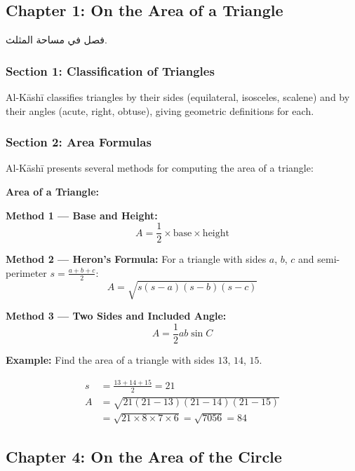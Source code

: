 \documentclass[11pt,a4paper]{article}
\newenvironment{arabicbox}{%
  \begin{framed}
  \begin{minipage}{\dimexpr\linewidth-2\fboxsep-2\fboxrule\relax}
  \setlength{\parindent}{0pt}
  \linespread{1.3}\selectfont
}{%
  \end{minipage}
  \end{framed}
}
\newenvironment{mathalgo}{%
  \par\vspace{0.3cm}
  \begin{framed}
  \setlength{\parindent}{0pt}
}{%
  \end{framed}
  \par\vspace{0.3cm}
}
\begin{document}
\subsection{Chapter 1: On the Area of a Triangle}

\begin{arabicbox}
\begin{Arabic}
فصل في مساحة المثلث.
\end{Arabic}
\end{arabicbox}

\vspace{0.3cm}

\subsubsection{Section 1: Classification of Triangles}

Al-K\=ash\=i classifies triangles by their sides (equilateral, isosceles,
scalene) and by their angles (acute, right, obtuse), giving geometric
definitions for each.

\subsubsection{Section 2: Area Formulas}

Al-K\=ash\=i presents several methods for computing the area of a triangle:

\begin{mathalgo}
\textbf{Area of a Triangle:}

\textbf{Method 1 --- Base and Height:}
\[
A = \frac{1}{2} \times \text{base} \times \text{height}
\]

\textbf{Method 2 --- Heron's Formula:}
For a triangle with sides $a$, $b$, $c$ and semi-perimeter $s =
\frac{a+b+c}{2}$:
\[
A = \sqrt{s(s-a)(s-b)(s-c)}
\]

\textbf{Method 3 --- Two Sides and Included Angle:}
\[
A = \frac{1}{2} ab \sin C
\]
\end{mathalgo}

\noindent\textbf{Example:} Find the area of a triangle with sides $13$,
$14$, $15$.

\begin{align*}
s &= \frac{13 + 14 + 15}{2} = 21 \\
A &= \sqrt{21(21-13)(21-14)(21-15)} \\
&= \sqrt{21 \times 8 \times 7 \times 6} = \sqrt{7056} = 84
\end{align*}

\subsection{Chapter 4: On the Area of the Circle}
\end{document}
